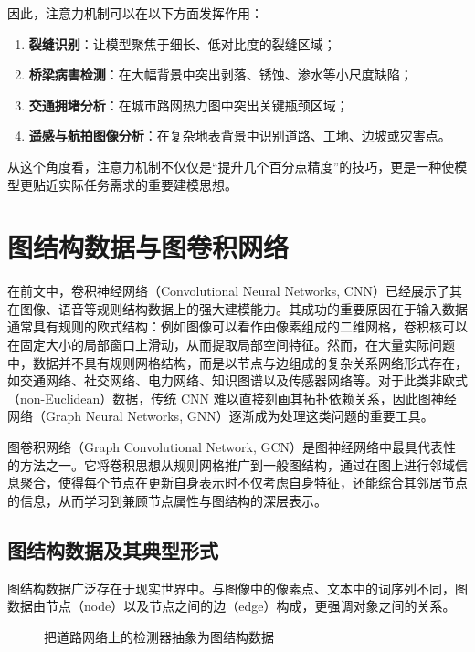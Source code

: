 因此，注意力机制可以在以下方面发挥作用：
\begin{enumerate}
    \item \textbf{裂缝识别}：让模型聚焦于细长、低对比度的裂缝区域；
    \item \textbf{桥梁病害检测}：在大幅背景中突出剥落、锈蚀、渗水等小尺度缺陷；
    \item \textbf{交通拥堵分析}：在城市路网热力图中突出关键瓶颈区域；
    \item \textbf{遥感与航拍图像分析}：在复杂地表背景中识别道路、工地、边坡或灾害点。
\end{enumerate}

从这个角度看，注意力机制不仅仅是“提升几个百分点精度”的技巧，更是一种使模型更贴近实际任务需求的重要建模思想。

\section{图结构数据与图卷积网络}
\label{subsec:gcn}

在前文中，卷积神经网络（Convolutional Neural Networks, CNN）已经展示了其在图像、语音等规则结构数据上的强大建模能力。其成功的重要原因在于输入数据通常具有规则的欧式结构：例如图像可以看作由像素组成的二维网格，卷积核可以在固定大小的局部窗口上滑动，从而提取局部空间特征。然而，在大量实际问题中，数据并不具有规则网格结构，而是以节点与边组成的复杂关系网络形式存在，如交通网络、社交网络、电力网络、知识图谱以及传感器网络等。对于此类非欧式（non-Euclidean）数据，传统 CNN 难以直接刻画其拓扑依赖关系，因此图神经网络（Graph Neural Networks, GNN）逐渐成为处理这类问题的重要工具。

图卷积网络（Graph Convolutional Network, GCN）是图神经网络中最具代表性的方法之一。它将卷积思想从规则网格推广到一般图结构，通过在图上进行邻域信息聚合，使得每个节点在更新自身表示时不仅考虑自身特征，还能综合其邻居节点的信息，从而学习到兼顾节点属性与图结构的深层表示。

\subsection{图结构数据及其典型形式}

图结构数据广泛存在于现实世界中。与图像中的像素点、文本中的词序列不同，图数据由节点（node）以及节点之间的边（edge）构成，更强调对象之间的关系。

\begin{figure}[H]
  \centering
  \resizebox{0.95\textwidth}{!}{}
  \caption{把道路网络上的检测器抽象为图结构数据}
  \label{fig:ch09_orig17}
\end{figure}

